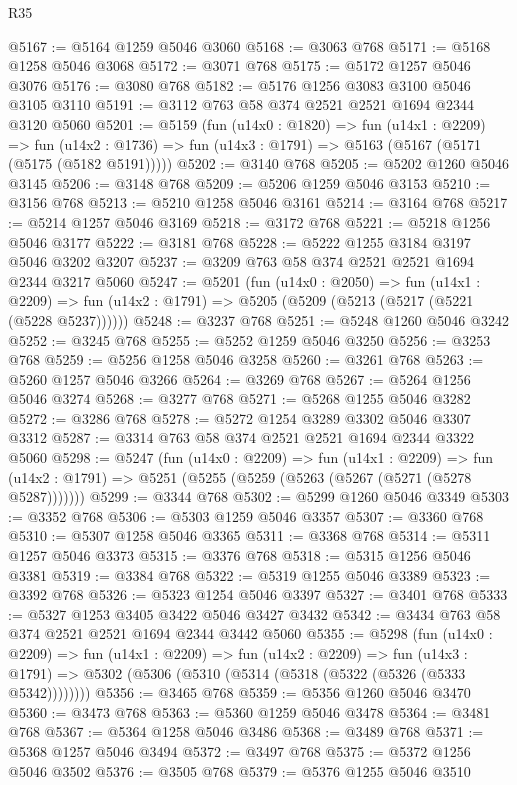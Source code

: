 \begin{lexlean}{R35}
\begin{coremodule}
@5167 := @5164 @1259 @5046 @3060
@5168 := @3063 @768
@5171 := @5168 @1258 @5046 @3068
@5172 := @3071 @768
@5175 := @5172 @1257 @5046 @3076
@5176 := @3080 @768
@5182 := @5176 @1256 @3083 @3100 @5046 @3105 @3110
@5191 := @3112 @763 @58 @374 @2521 @2521 @1694 @2344 @3120 @5060
@5201 := @5159
    (fun (u14x0 : @1820) =>
    fun (u14x1 : @2209) =>
    fun (u14x2 : @1736) => fun (u14x3 : @1791) => @5163 (@5167 (@5171 (@5175 (@5182 @5191)))))
@5202 := @3140 @768
@5205 := @5202 @1260 @5046 @3145
@5206 := @3148 @768
@5209 := @5206 @1259 @5046 @3153
@5210 := @3156 @768
@5213 := @5210 @1258 @5046 @3161
@5214 := @3164 @768
@5217 := @5214 @1257 @5046 @3169
@5218 := @3172 @768
@5221 := @5218 @1256 @5046 @3177
@5222 := @3181 @768
@5228 := @5222 @1255 @3184 @3197 @5046 @3202 @3207
@5237 := @3209 @763 @58 @374 @2521 @2521 @1694 @2344 @3217 @5060
@5247 := @5201
    (fun (u14x0 : @2050) =>
    fun (u14x1 : @2209) =>
    fun (u14x2 : @1791) => @5205 (@5209 (@5213 (@5217 (@5221 (@5228 @5237))))))
@5248 := @3237 @768
@5251 := @5248 @1260 @5046 @3242
@5252 := @3245 @768
@5255 := @5252 @1259 @5046 @3250
@5256 := @3253 @768
@5259 := @5256 @1258 @5046 @3258
@5260 := @3261 @768
@5263 := @5260 @1257 @5046 @3266
@5264 := @3269 @768
@5267 := @5264 @1256 @5046 @3274
@5268 := @3277 @768
@5271 := @5268 @1255 @5046 @3282
@5272 := @3286 @768
@5278 := @5272 @1254 @3289 @3302 @5046 @3307 @3312
@5287 := @3314 @763 @58 @374 @2521 @2521 @1694 @2344 @3322 @5060
@5298 := @5247
    (fun (u14x0 : @2209) =>
    fun (u14x1 : @2209) =>
    fun (u14x2 : @1791) => @5251 (@5255 (@5259 (@5263 (@5267 (@5271 (@5278 @5287)))))))
@5299 := @3344 @768
@5302 := @5299 @1260 @5046 @3349
@5303 := @3352 @768
@5306 := @5303 @1259 @5046 @3357
@5307 := @3360 @768
@5310 := @5307 @1258 @5046 @3365
@5311 := @3368 @768
@5314 := @5311 @1257 @5046 @3373
@5315 := @3376 @768
@5318 := @5315 @1256 @5046 @3381
@5319 := @3384 @768
@5322 := @5319 @1255 @5046 @3389
@5323 := @3392 @768
@5326 := @5323 @1254 @5046 @3397
@5327 := @3401 @768
@5333 := @5327 @1253 @3405 @3422 @5046 @3427 @3432
@5342 := @3434 @763 @58 @374 @2521 @2521 @1694 @2344 @3442 @5060
@5355 := @5298
    (fun (u14x0 : @2209) =>
    fun (u14x1 : @2209) =>
    fun (u14x2 : @2209) =>
    fun (u14x3 : @1791) => @5302 (@5306 (@5310 (@5314 (@5318 (@5322 (@5326 (@5333 @5342))))))))
@5356 := @3465 @768
@5359 := @5356 @1260 @5046 @3470
@5360 := @3473 @768
@5363 := @5360 @1259 @5046 @3478
@5364 := @3481 @768
@5367 := @5364 @1258 @5046 @3486
@5368 := @3489 @768
@5371 := @5368 @1257 @5046 @3494
@5372 := @3497 @768
@5375 := @5372 @1256 @5046 @3502
@5376 := @3505 @768
@5379 := @5376 @1255 @5046 @3510

\end{coremodule}
\end{lexlean}
